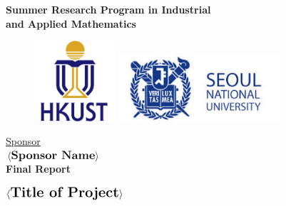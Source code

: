 \thispagestyle{empty}

\def\shiftdowna{0.32in}  %
\def\shiftdownb{0.22in}  %


\begin{center}
\textbf{{\large Summer Research Program in Industrial \\ and Applied Mathematics}}\\

\vspace \shiftdowna

\begin{figure}[h]
  \centering
  \begin{minipage}[b]{0.4\textwidth}
    \centering
    \includegraphics[width=3cm]{Graphics/HKUST_logo.jpg}
      \end{minipage}
  \begin{minipage}[b]{0.4\textwidth}
    \centering
    \includegraphics[width=6cm]{Graphics/SNU_logo.jpg}
      \end{minipage}
\end{figure}

\vspace \shiftdowna
\underline {Sponsor}\\ 
\vspace{5pt}
$\langle \textbf{{\large Sponsor Name}} \rangle$ \\
\vspace \shiftdowna
\textbf{Final Report}

\vspace \shiftdowna
$\langle \textbf{{\Large Title of Project}}\rangle$



\end{center}
